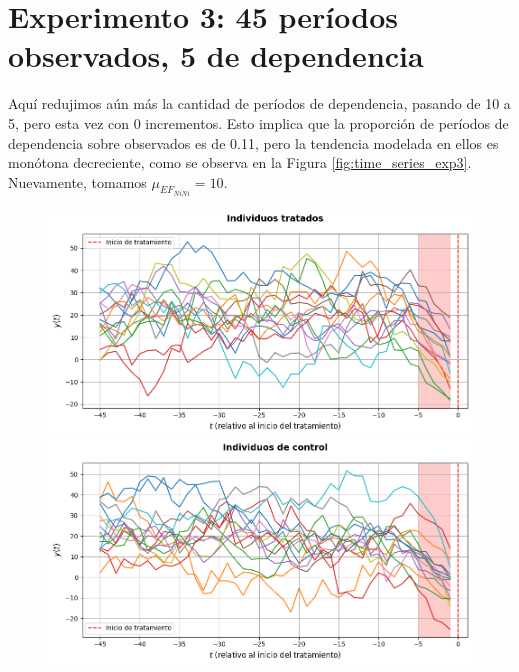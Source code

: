 \documentclass[../../main.tex]{subfiles}
\begin{document}
\section{Experimento 3: 45 períodos observados, 5 de dependencia} \label{sec:exp3} 
Aquí redujimos aún más la cantidad de períodos de dependencia, pasando de 10 a 5, pero
esta vez con 0 incrementos. Esto implica que la proporción de períodos de dependencia
sobre observados es de 0.11, pero la tendencia modelada en ellos es monótona decreciente,
como se observa en la Figura \ref{fig:time_series_exp3}. Nuevamente, tomamos
\(\mu_{{EF}_{NiNi}} = 10\).

\begin{figure}[ht]
    \centering
    \begin{minipage}{0.48\textwidth}
        \centering
        \includegraphics[scale=0.3]{figs/Exp3/tratados_sim63.png}
    \end{minipage}
    \hfill
    \begin{minipage}{0.48\textwidth}
        \centering
        \includegraphics[scale=0.3]{figs/Exp3/controles_sim63.png}
    \end{minipage}
    \vspace{0.5em}

\end{figure}
\end{document}
